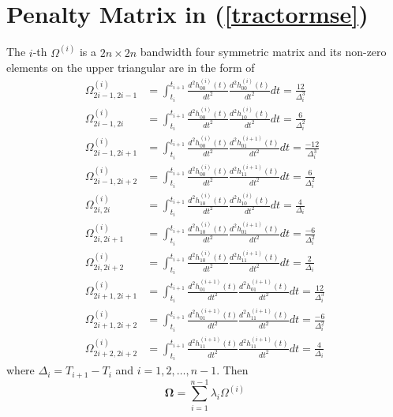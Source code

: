 


\section{Penalty Matrix in (\ref{tractormse})}\label{PenaltyTermDetails}

The $i$-th $\Omega^{(i)}$ is a $2n \times 2n$ bandwidth four symmetric matrix and its non-zero elements on the upper triangular are in the form of
\begin{align}
\Omega_{2i-1,2i-1}^{(i)} & =\int_{t_{i}}^{t_{i+1}} \frac{d^2 h_{00}^{(i)}(t)}{dt^2}  \frac{d^2 h_{00}^{(i)}(t)}{dt^2} dt=\frac{12}{\Delta_i^3}\\
\Omega_{2i-1,2i}^{(i)} &=\int_{t_{i}}^{t_{i+1}} \frac{d^2 h_{00}^{(i)}(t)}{dt^2}  \frac{d^2 h_{10}^{(i)}(t)}{dt^2} dt=\frac{6}{\Delta_i^2}\\
\Omega_{2i-1,2i+1}^{(i)} &=\int_{t_{i}}^{t_{i+1}} \frac{d^2 h_{00}^{(i)}(t)}{dt^2}  \frac{d^2 h_{01}^{(i+1)}(t)}{dt^2} dt=\frac{-12}{\Delta_i^3}\\
\Omega_{2i-1,2i+2}^{(i)} &=\int_{t_{i}}^{t_{i+1}} \frac{d^2 h_{00}^{(i)}(t)}{dt^2}  \frac{d^2 h_{11}^{(i+1)}(t)}{dt^2} dt=\frac{6}{\Delta_i^2}\\
\Omega_{2i,2i}^{(i)} &=\int_{t_{i}}^{t_{i+1}} \frac{d^2 h_{10}^{(i)}(t)}{dt^2}  \frac{d^2 h_{10}^{(i)}(t)}{dt^2} dt=\frac{4}{\Delta_i} \\
\Omega_{2i,2i+1}^{(i)} &=\int_{t_{i}}^{t_{i+1}} \frac{d^2 h_{10}^{(i)}(t)}{dt^2}  \frac{d^2 h_{01}^{(i+1)}(t)}{dt^2} dt=\frac{-6}{\Delta_i^2}\\
\Omega_{2i,2i+2}^{(i)} &=\int_{t_{i}}^{t_{i+1}} \frac{d^2 h_{10}^{(i)}(t)}{dt^2}  \frac{d^2 h_{11}^{(i+1)}(t)}{dt^2} dt=\frac{2}{\Delta_i}\\
\Omega_{2i+1,2i+1}^{(i)} &=\int_{t_{i}}^{t_{i+1}} \frac{d^2 h_{01}^{(i+1)}(t)}{dt^2}  \frac{d^2 h_{01}^{(i+1)}(t)}{dt^2} dt=\frac{12}{\Delta_i^3}\\
\Omega_{2i+1,2i+2}^{(i)} &=\int_{t_{i}}^{t_{i+1}} \frac{d^2 h_{01}^{(i+1)}(t)}{dt^2}  \frac{d^2 h_{11}^{(i+1)}(t)}{dt^2} dt=\frac{-6}{\Delta_i^2}\\
\Omega_{2i+2,2i+2}^{(i)} &=\int_{t_{i}}^{t_{i+1}} \frac{d^2 h_{11}^{(i+1)}(t)}{dt^2}  \frac{d^2 h_{11}^{(i+1)}(t)}{dt^2} dt=\frac{4}{\Delta_i}
\end{align}
where $\Delta_i=T_{i+1}-T_i$ and $i=1,2,\ldots,n-1$. Then 
\begin{equation*}
\mathbf{\Omega}=\sum_{i=1}^{n-1}\lambda_i\Omega^{(i)}
\end{equation*}



